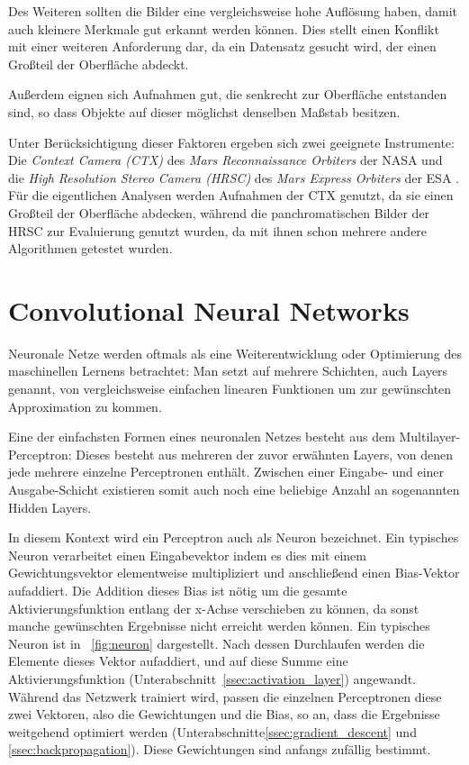 Des Weiteren sollten die Bilder eine vergleichsweise hohe Auflösung haben, damit auch kleinere Merkmale gut erkannt werden können. Dies stellt einen Konflikt mit einer weiteren Anforderung dar, da ein Datensatz gesucht wird, der einen Großteil der Oberfläche abdeckt.

Außerdem eignen sich Aufnahmen gut, die senkrecht zur Oberfläche entstanden sind, so dass Objekte auf dieser möglichst denselben Maßstab besitzen.

Unter Berücksichtigung dieser Faktoren ergeben sich \ua zwei geeignete Instrumente:
Die \textit{Context Camera (CTX)} des \textit{Mars Reconnaissance Orbiters} der NASA \cite{malin_07} und die \textit{High Resolution Stereo Camera (HRSC)} des \textit{Mars Express Orbiters} der ESA \cite{hrsc}. Für die eigentlichen Analysen werden Aufnahmen der CTX genutzt, da sie einen Großteil der Oberfläche abdecken, während die panchromatischen Bilder der HRSC zur Evaluierung genutzt wurden, da mit ihnen schon mehrere andere Algorithmen getestet wurden.

\section{Convolutional Neural Networks}
\label{sec:cnn}

Neuronale Netze werden oftmals als eine Weiterentwicklung oder Optimierung des maschinellen Lernens betrachtet: Man setzt auf mehrere Schichten, auch Layers genannt, von vergleichsweise einfachen linearen Funktionen um zur gewünschten Approximation zu kommen. \cite{hardesty_17}

Eine der einfachsten Formen eines neuronalen Netzes besteht aus dem Multilayer-Perceptron: Dieses besteht aus mehreren der zuvor erwähnten Layers, von denen jede mehrere einzelne Perceptronen enthält. Zwischen einer Eingabe- und einer Ausgabe-Schicht existieren somit auch noch eine beliebige Anzahl an sogenannten Hidden Layers.

In diesem Kontext wird ein Perceptron auch als Neuron bezeichnet. Ein typisches Neuron verarbeitet einen Eingabevektor indem es dies mit einem Gewichtungsvektor elementweise multipliziert und anschließend einen Bias-Vektor aufaddiert. Die Addition dieses Bias ist nötig um die gesamte Aktivierungsfunktion entlang der x-Achse verschieben zu können, da sonst manche gewünschten Ergebnisse nicht erreicht werden können. \cite{bias} Ein typisches Neuron ist in \figurename~\ref{fig:neuron} dargestellt. Nach dessen Durchlaufen werden die Elemente dieses Vektor aufaddiert, und auf diese Summe eine Aktivierungsfunktion (\vgl Unterabschnitt~\ref{ssec:activation_layer}) angewandt. Während das Netzwerk trainiert wird, passen die einzelnen Perceptronen diese zwei Vektoren, also die Gewichtungen und die Bias, so an, dass die Ergebnisse weitgehend optimiert werden (\vgl Unterabschnitte\ref{ssec:gradient_descent} und \ref{ssec:backpropagation}). Diese Gewichtungen sind anfangs zufällig bestimmt. \cite{hardesty_17, cs231n} 

